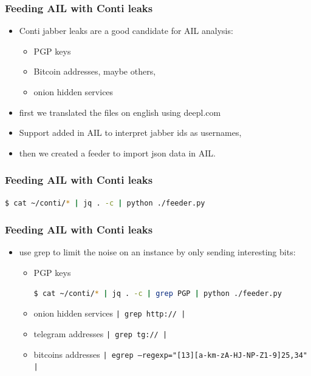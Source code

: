 \begin{frame}[fragile]                                                                                                                        

   \frametitle{Feeding AIL with Conti leaks}

        \begin{itemize}
		\item Conti jabber leaks are a good candidate for AIL analysis:
        	\begin{itemize}
			\item PGP keys
			\item Bitcoin addresses, maybe others,
			\item onion hidden services
        	\end{itemize}
                \item first we translated the files on english using deepl.com 
		\item Support added in AIL to interpret jabber ids as usernames,
		\item then we created a feeder to import json data in AIL.
        \end{itemize}

\end{frame}


\begin{frame}[fragile]                                                                                                                        
   \frametitle{Feeding AIL with Conti leaks}
	

	\begin{lstlisting}[language=bash]
	$ cat ~/conti/* | jq . -c | python ./feeder.py
	\end{lstlisting}

\end{frame}

\begin{frame}[fragile]                                                                                                                        

\frametitle{Feeding AIL with Conti leaks}

    \begin{itemize}
    \item use grep to limit the noise on an instance by only sending interesting bits:
        \begin{itemize}
        \item PGP keys
\begin{lstlisting}[language=bash]
$ cat ~/conti/* | jq . -c | grep PGP | python ./feeder.py
\end{lstlisting}
        \item onion hidden services \texttt{| grep http:// |}
        \item telegram addresses \texttt{| grep tg:// | }
        \item bitcoins addresses \texttt{| egrep --regexp="[13][a-km-zA-HJ-NP-Z1-9]{25,34}" | }

        \end{itemize}
    \end{itemize}

\end{frame}
